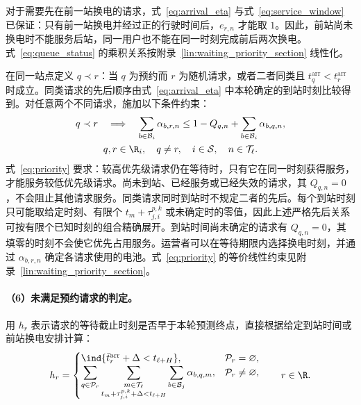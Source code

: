 对于需要先在前一站换电的请求，式~\eqref{eq:arrival_eta} 与式~\eqref{eq:service_window} 已保证：只有前一站换电并经过正的行驶时间后，$e_{r,n}$ 才能取 $1$。因此，前站尚未换电时不能服务后站，同一用户也不能在同一时刻完成前后两次换电。式~\eqref{eq:queue_status} 的乘积关系按附录~\ref{lin:waiting_priority_section} 线性化。

在同一站点定义 $q\prec r$：当 $q$ 为预约而 $r$ 为随机请求，或者二者同类且 $t_q^{\mathrm{arr}}<t_r^{\mathrm{arr}}$ 时成立。同类请求的先后顺序由式~\eqref{eq:arrival_eta} 中本轮确定的到站时刻比较得到。对任意两个不同请求，施加以下条件约束：
\begin{equation}
\begin{gathered}
q\prec r\quad\Longrightarrow\quad
\sum_{b\in\mathcal B_i}\alpha_{b,r,n}
\le 1-Q_{q,n}+\sum_{b\in\mathcal B_i}\alpha_{b,q,n},\\
q,r\in\R_i,\quad q\ne r,\quad i\in\mathcal S,\quad n\in\mathcal T_\ell.
\end{gathered}
\label{eq:priority}
\end{equation}
式~\eqref{eq:priority} 要求：较高优先级请求仍在等待时，只有它在同一时刻获得服务，才能服务较低优先级请求。尚未到站、已经服务或已经失效的请求，其 $Q_{q,n}=0$，不会阻止其他请求服务。同类请求同时到站时不规定二者的先后。每个到站时刻只可能取给定时刻、有限个 $t_m+\tau_{j,i}^{p,k}$ 或未确定时的零值，因此上述严格先后关系可按有限个已知时刻的组合精确展开。到站时间尚未确定的请求有 $Q_{q,n}=0$，其填零的时刻不会使它优先占用服务。运营者可以在等待期限内选择换电时刻，并通过 $\alpha_{b,r,n}$ 确定各请求使用的电池。式~\eqref{eq:priority} 的等价线性约束见附录~\ref{lin:waiting_priority_section}。

\paragraph{（6）未满足预约请求的判定。}
用 $h_r$ 表示请求的等待截止时刻是否早于本轮预测终点，直接根据给定到站时间或前站换电安排计算：
\begin{equation}
h_r=\begin{cases}
\ind\{\bar t_r^{\mathrm{arr}}+\Delta<t_{\ell+H}\},
&\mathcal P_r=\varnothing,\\
\displaystyle\sum_{q\in\mathcal P_r}
\sum_{\substack{m\in\mathcal T_\ell\\
t_m+\tau_{j,i}^{p,k}+\Delta<t_{\ell+H}}}
\sum_{b\in\mathcal B_j}\alpha_{b,q,m},
&\mathcal P_r\ne\varnothing,
\end{cases}
\qquad r\in\R.
\label{eq:deadline_passed}
\end{equation}


